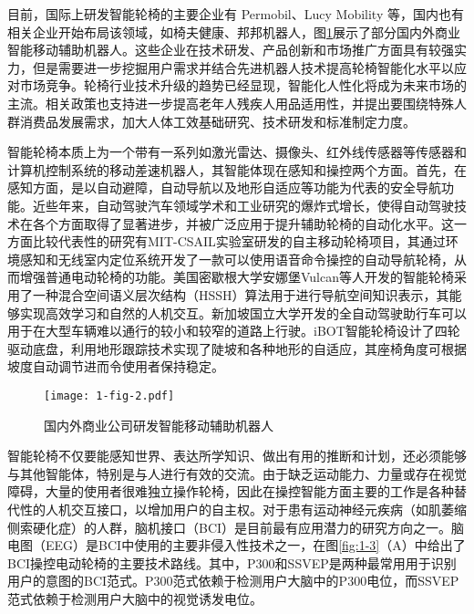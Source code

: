 目前，国际上研发智能轮椅的主要企业有 Permobil、Lucy Mobility 等，国内也有相关企业开始布局该领域，如椅夫健康、邦邦机器人，图\ref{fig:1-2}展示了部分国内外商业智能移动辅助机器人。这些企业在技术研发、产品创新和市场推广方面具有较强实力，但是需要进一步挖掘用户需求并结合先进机器人技术提高轮椅智能化水平以应对市场竞争。轮椅行业技术升级的趋势已经显现，智能化人性化将成为未来市场的主流。相关政策也支持进一步提高老年人残疾人用品适用性，并提出要围绕特殊人群消费品发展需求，加大人体工效基础研究、技术研发和标准制定力度。

智能轮椅本质上为一个带有一系列如激光雷达、摄像头、红外线传感器等传感器和计算机控制系统的移动差速机器人\cite{ngIndirectControlAutonomous2020a,leamanComprehensiveReviewSmart2017}，其智能体现在感知和操控两个方面\cite{kimLiteratureReviewSmart2023}。首先，在感知方面，是以自动避障，自动导航以及地形自适应等功能为代表的安全导航功能。近些年来，自动驾驶汽车领域学术和工业研究的爆炸式增长，使得自动驾驶技术在各个方面取得了显著进步，并被广泛应用于提升辅助轮椅的自动化水平。这一方面比较代表性的研究有MIT-CSAIL实验室研发的自主移动轮椅项目\cite{walterFrameworkLearningSemantic2014}，其通过环境感知和无线室内定位系统开发了一款可以使用语音命令操控的自动导航轮椅，从而增强普通电动轮椅的功能。美国密歇根大学安娜堡Vulcan等人\cite{fosterReflectanceFieldMap2023,parkDiscretetimeDynamicModeling2017}开发的智能轮椅采用了一种混合空间语义层次结构（HSSH）算法用于进行导航空间知识表示，其能够实现高效学习和自然的人机交互。新加坡国立大学开发的全自动驾驶助行车\cite{SelfdrivingScooterUnveiled}可以用于在大型车辆难以通行的较小和较窄的道路上行驶。iBOT智能轮椅设计了四轮驱动底盘\cite{MobiusMobilityNext}，利用地形跟踪技术实现了陡坡和各种地形的自适应，其座椅角度可根据坡度自动调节进而令使用者保持稳定。
\begin{figure}[h]
  \centering
  \texttt{[image: 1-fig-2.pdf]}
  \caption{国内外商业公司研发智能移动辅助机器人}
  \label{fig:1-2}
\end{figure}

智能轮椅不仅要能感知世界、表达所学知识、做出有用的推断和计划，还必须能够与其他智能体，特别是与人进行有效的交流。由于缺乏运动能力、力量或存在视觉障碍，大量的使用者很难独立操作轮椅\cite{hartmanHumanMachineInterfaceSmart2019}，因此在操控智能方面主要的工作是各种替代性的人机交互接口，以增加用户的自主权。对于患有运动神经元疾病（如肌萎缩侧索硬化症）的人群，脑机接口（BCI）是目前最有应用潜力的研究方向之一。脑电图（EEG）是BCI中使用的主要非侵入性技术之一，在图\ref{fig:1-3}（A）中给出了BCI操控电动轮椅的主要技术路线\cite{naserPracticalBCIDrivenWheelchairs2023}。其中，P300和SSVEP是两种最常用用于识别用户的意图的BCI范式。P300范式依赖于检测用户大脑中的P300电位\cite{rebsamenBrainControlledWheelchair2010}，而SSVEP范式依赖于检测用户大脑中的视觉诱发电位\cite{dongMultimodalBrainComputer2022,ngIndirectControlAutonomous2020a,mistrySSVEPBasedBrain2018}。

